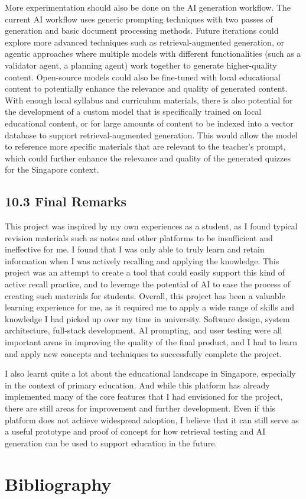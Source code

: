 \documentclass[
  12pt,
  a4paper,
]{report}
\begin{document}
More experimentation should also be done on the AI generation workflow.
The current AI workflow uses generic prompting techniques with two
passes of generation and basic document processing methods. Future
iterations could explore more advanced techniques such as
retrieval-augmented generation, or agentic approaches where multiple
models with different functionalities (such as a validator agent, a
planning agent) work together to generate higher-quality content.
Open-source models could also be fine-tuned with local educational
content to potentially enhance the relevance and quality of generated
content. With enough local syllabus and curriculum materials, there is
also potential for the development of a custom model that is
specifically trained on local educational content, or for large amounts
of content to be indexed into a vector database to support
retrieval-augmented generation. This would allow the model to reference
more specific materials that are relevant to the teacher's prompt, which
could further enhance the relevance and quality of the generated quizzes
for the Singapore context.

\hypertarget{final-remarks}{%
\section{10.3 Final Remarks}\label{final-remarks}}

This project was inspired by my own experiences as a student, as I found
typical revision materials such as notes and other platforms to be
insufficient and ineffective for me. I found that I was only able to
truly learn and retain information when I was actively recalling and
applying the knowledge. This project was an attempt to create a
tool that could easily support this kind of active recall practice, and
to leverage the potential of AI to ease the process of creating such
materials for students. Overall, this project has been a valuable
learning experience for me, as it required me to apply a wide range of
skills and knowledge I had picked up over my time in university.
Software design, system architecture, full-stack development, AI
prompting, and user testing were all important areas in improving the
quality of the final product, and I had to learn and apply new concepts
and techniques to successfully complete the
project.

I also learnt quite a lot about the educational landscape in Singapore, especially in
the context of primary education. And while this platform has already
implemented many of the core features that I had envisioned for the project,
there are still areas for improvement and further development.
Even if this platform does not achieve widespread adoption, I believe that it
can still serve as a useful prototype and proof of
concept for how retrieval testing and AI generation can be used to
support education in the future.
\clearpage
\hypertarget{bibliography}{%
\chapter{Bibliography}\label{bibliography}}
\end{document}
